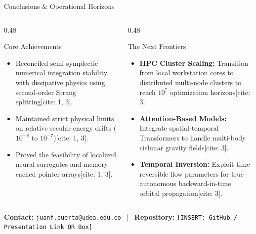 \documentclass[presentation,10pt,aspectratio=169]{beamer}
\begin{document}
\begin{frame}{Conclusions \& Operational Horizons}
    \begin{columns}[T]
        \begin{column}{0.48\textwidth}
            \begin{block}{Core Achievements}
                \begin{itemize}
                    \item Reconciled semi-symplectic numerical integration stability with dissipative physics using second-order Strang splitting[cite: 1, 3].
                    \item Maintained strict physical limits on relative secular energy drifts ($10^{-8}$ to $10^{-7}$)[cite: 1, 3].
                    \item Proved the feasibility of localized neural surrogates and memory-cached pointer arrays[cite: 1, 3].
                \end{itemize}
            \end{block}
        \end{column}
        \begin{column}{0.48\textwidth}
            \begin{exampleblock}{The Next Frontiers}
                \begin{itemize}
                    \item \textbf{HPC Cluster Scaling:} Transition from local workstation cores to distributed multi-node clusters to reach $10^7$ optimization horizons[cite: 3].
                    \item \textbf{Attention-Based Models:} Integrate spatial-temporal Transformers to handle multi-body cislunar gravity fields[cite: 3].
                    \item \textbf{Temporal Inversion:} Exploit time-reversible flow parameters for true autonomous backward-in-time orbital propagation[cite: 3].
                \end{itemize}
            \end{exampleblock}
        \end{column}
    \end{columns}
    \vspace{0.4cm}
    \centering
    \footnotesize \textbf{Contact:} \texttt{juanf.puerta@udea.edu.co} \, | \, \textbf{Repository:} \texttt{[INSERT: GitHub / Presentation Link QR Box]}
\end{frame}
\end{document}
